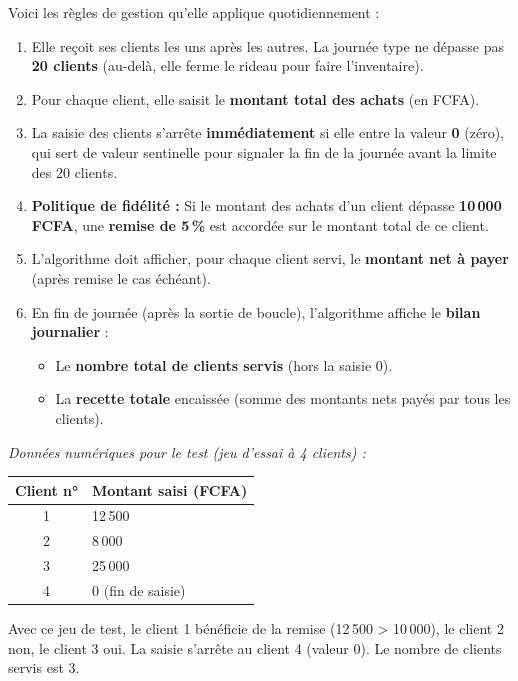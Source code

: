 \documentclass[11pt]{article}
\newcommand{\cle}[1]{{\popxbold\color{popdark}#1}}
\begin{document}
Voici les règles de gestion qu'elle applique quotidiennement :
\begin{enumerate}
    \item Elle reçoit ses clients les uns après les autres. La journée type ne dépasse pas \textbf{20 clients} (au-delà, elle ferme le rideau pour faire l'inventaire).
    \item Pour chaque client, elle saisit le \textbf{montant total des achats} (en FCFA).
    \item La saisie des clients s'arrête \textbf{immédiatement} si elle entre la valeur \textbf{0} (zéro), qui sert de \cle{valeur sentinelle} pour signaler la fin de la journée avant la limite des 20 clients.
    \item \textbf{Politique de fidélité :} Si le montant des achats d'un client dépasse \textbf{10\,000 FCFA}, une \textbf{remise de 5\,\%} est accordée sur le montant total de ce client.
    \item L'algorithme doit afficher, pour chaque client servi, le \textbf{montant net à payer} (après remise le cas échéant).
    \item En fin de journée (après la sortie de boucle), l'algorithme affiche le \textbf{bilan journalier} :
    \begin{itemize}
        \item Le \textbf{nombre total de clients servis} (hors la saisie 0).
        \item La \textbf{recette totale} encaissée (somme des montants nets payés par tous les clients).
    \end{itemize}
\end{enumerate}

\emph{Données numériques pour le test (jeu d'essai à 4 clients) :}
\begin{center}
\begin{tabularx}{\linewidth}{|c|X|}\hline
\textbf{Client n°} & \textbf{Montant saisi (FCFA)} \\\hline
1 & 12\,500 \\\hline
2 & 8\,000 \\\hline
3 & 25\,000 \\\hline
4 & 0 (fin de saisie) \\\hline
\end{tabularx}
\end{center}
Avec ce jeu de test, le client 1 bénéficie de la remise (12\,500 > 10\,000), le client 2 non, le client 3 oui. La saisie s'arrête au client 4 (valeur 0). Le nombre de clients servis est 3.
\end{document}
